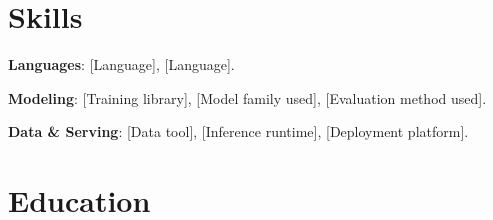 \documentclass{resume}
\begin{document}
\section{Skills}
\begin{skillitems}
  \item \textbf{Languages}: [Language], [Language].
  \item \textbf{Modeling}: [Training library], [Model family used], [Evaluation method used].
  \item \textbf{Data \& Serving}: [Data tool], [Inference runtime], [Deployment platform].
\end{skillitems}

\section{Education}
\end{document}
